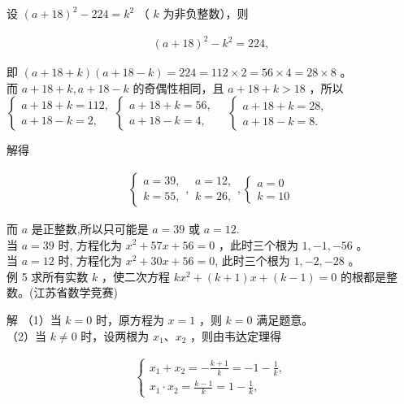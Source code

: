 \documentclass[10pt]{article}
\begin{document}
设 $(a+18)^{2}-224=k^{2}$ （ $k$ 为非负整数），则

\begin{align*}
(a+18)^{2}-k^{2}=224,
\end{align*}

即 $(a+18+k)(a+18-k)=224=112 \times 2=56 \times 4=28 \times 8$ 。\\
而 $a+18+k, a+18-k$ 的奇偶性相同，且 $a+18+k>18$ ，所以 $\left\{\begin{array}{l}a+18+k=112, \\ a+18-k=2,\end{array}\left\{\begin{array}{l}a+18+k=56, \\ a+18-k=4,\end{array} \quad\left\{\begin{array}{l}a+18+k=28, \\ a+18-k=8 .\end{array}\right.\right.\right.$

解得

\begin{align*}
\left\{\begin{array}{l}
a=39, \\
k=55,
\end{array}, \begin{array}{l}
a=12, \\
k=26,
\end{array},\left\{\begin{array}{l}
a=0 \\
k=10
\end{array}\right.\right.
\end{align*}

而 $a$ 是正整数,所以只可能是 $a=39$ 或 $a=12$.\\
当 $a=39$ 时, 方程化为 $x^{2}+57 x+56=0$ ，此时三个根为 $1,-1,-56$ 。\\
当 $a=12$ 时, 方程化为 $x^{2}+30 x+56=0$, 此时三个根为 $1,-2,-28$ 。\\
例 5 求所有实数 $k$ ，使二次方程 $k x^{2}+(k+1) x+(k-1)=0$ 的根都是整数。(江苏省数学竞赛)

解 （1）当 $k=0$ 时，原方程为 $x=1$ ，则 $k=0$ 满足题意。\\
（2）当 $k \neq 0$ 时，设两根为 $x_{1} 、 x_{2}$ ，则由韦达定理得

\begin{align*}
\left\{\begin{array}{l}
x_{1}+x_{2}=-\frac{k+1}{k}=-1-\frac{1}{k}, \\
x_{1} \cdot x_{2}=\frac{k-1}{k}=1-\frac{1}{k},
\end{array}\right.
\end{align*}
\end{document}
